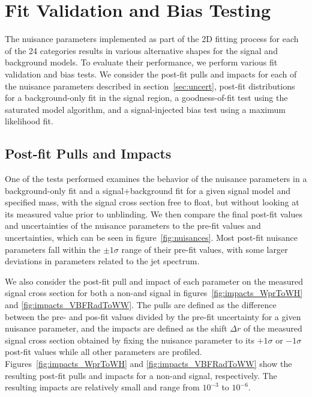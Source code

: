 
\section{Fit Validation and Bias Testing}
\label{sec:bias}

The nuisance parameters implemented as part of the 2D fitting process for each of the 24 categories results in various alternative shapes for the signal and background models.
To evaluate their performance, we perform various fit validation and bias tests.
We consider the post-fit pulls and impacts for each of the nuisance parameters described in section~\ref{sec:uncert}, post-fit distributions for a background-only fit in the signal region, a goodness-of-fit test using the saturated model algorithm, and a signal-injected bias test using a maximum likelihood fit.

\subsection{Post-fit Pulls and Impacts}

One of the tests performed examines the behavior of the nuisance parameters in a background-only fit and a signal+background fit for a given signal model and specified mass, with the signal cross section free to float, but without looking at its measured value prior to unblinding.
We then compare the final post-fit values and uncertainties of the nuisance parameters to the pre-fit values and uncertainties, which can be seen in figure~\ref{fig:nuisances}.
Most post-fit nuisance parameters fall within the $\pm1\sigma$ range of their pre-fit values, with some larger deviations in parameters related to the jet \pt spectrum.

We also consider the post-fit pull and impact of each parameter on the measured signal cross section for both a non-\VBF and \VBF signal in figures~\ref{fig:impacts_WprToWH} and \ref{fig:impacts_VBFRadToWW}.
The pulls are defined as the difference between the pre- and pos-fit values divided by the pre-fit uncertainty for a given nuisance parameter, and the impacts are defined as the shift $\Delta r$ of the measured signal cross section obtained by fixing the nuisance parameter to its $+1\sigma$ or $-1\sigma$ post-fit values while all other parameters are profiled.
Figures~\ref{fig:impacts_WprToWH} and \ref{fig:impacts_VBFRadToWW} show the resulting post-fit pulls and impacts for a non-\VBF and \VBF signal, respectively.
The resulting impacts are relatively small and range from $10^{-3}$ to $10^{-6}$.

